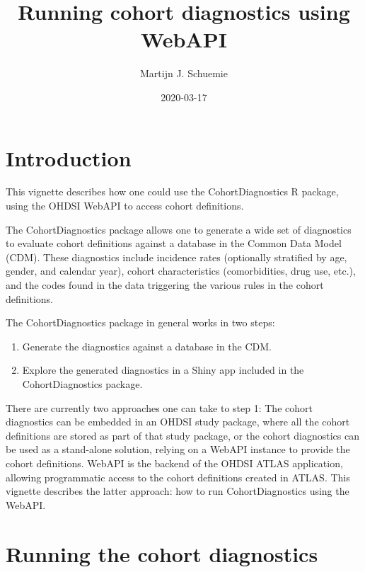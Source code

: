 \documentclass[
]{article}
\title{Running cohort diagnostics using WebAPI}
\author{Martijn J. Schuemie}
\date{2020-03-17}
\providecommand{\tightlist}{%
  \setlength{\itemsep}{0pt}\setlength{\parskip}{0pt}}
\begin{document}
\maketitle

{
\setcounter{tocdepth}{2}
\tableofcontents
}
\hypertarget{introduction}{%
\section{Introduction}\label{introduction}}

This vignette describes how one could use the CohortDiagnostics R
package, using the OHDSI WebAPI to access cohort definitions.

The CohortDiagnostics package allows one to generate a wide set of
diagnostics to evaluate cohort definitions against a database in the
Common Data Model (CDM). These diagnostics include incidence rates
(optionally stratified by age, gender, and calendar year), cohort
characteristics (comorbidities, drug use, etc.), and the codes found in
the data triggering the various rules in the cohort definitions.

The CohortDiagnostics package in general works in two steps:

\begin{enumerate}
\def\labelenumi{\arabic{enumi}.}
\tightlist
\item
  Generate the diagnostics against a database in the CDM.
\item
  Explore the generated diagnostics in a Shiny app included in the
  CohortDiagnostics package.
\end{enumerate}

There are currently two approaches one can take to step 1: The cohort
diagnostics can be embedded in an OHDSI study package, where all the
cohort definitions are stored as part of that study package, or the
cohort diagnostics can be used as a stand-alone solution, relying on a
WebAPI instance to provide the cohort definitions. WebAPI is the backend
of the OHDSI ATLAS application, allowing programmatic access to the
cohort definitions created in ATLAS. This vignette describes the latter
approach: how to run CohortDiagnostics using the WebAPI.

\hypertarget{running-the-cohort-diagnostics}{%
\section{Running the cohort
diagnostics}\label{running-the-cohort-diagnostics}}
\end{document}
